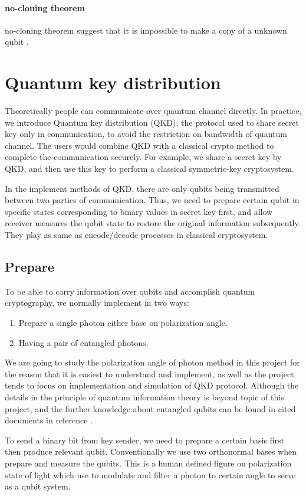 \documentclass[12pt]{article}
\begin{document}
\paragraph{no-cloning theorem}
no-cloning theorem suggest that it is impossible to make a copy of a unknown qubit \cite[p.25]{nielsen2000quantum}.

\section{Quantum key distribution}
Theoretically people can communicate over quantum channel directly. In practice, we introduce Quantum key distribution (QKD), the protocol used to share secret key only in communication, to avoid the restriction on bandwidth of quantum channel. The users would combine QKD with a classical crypto method to complete the communication securely. For example, we share a secret key by QKD, and then use this key to perform a classical symmetric-key cryptosystem.

In the implement methods of QKD, there are only qubits being transmitted between two parties of communication. Thus, we need to prepare certain qubit in specific states corresponding to binary values in secret key first, and allow receiver measures the qubit state to restore the original information subsequently. They play as same as encode/decode processes in classical cryptosystem.
\subsection{Prepare}
To be able to carry information over qubits and accomplish quantum cryptography, we normally implement in two ways:
\begin{enumerate} 
\item Prepare a single photon either base on polarization angle.
\item Having a pair of entangled photons.
\end{enumerate}
We are going to study the polarization angle of photon method in this project for the reason that it is easiest to understand and implement, as well as the project tends to focus on implementation and simulation of QKD protocol. Although the details in the principle of quantum information theory is beyond topic of this project, and the further knowledge about entangled qubits can be found in cited documents in reference \cite{nielsen2000quantum}.

To send a binary bit from key sender, we need to prepare a certain basis first then produce relevant qubit. Conventionally we use two orthonormal bases when prepare and measure the qubits. This is a human defined figure on polarization state of light which use to modulate and filter a photon to certain angle to serve as a qubit system. 
\end{document}

